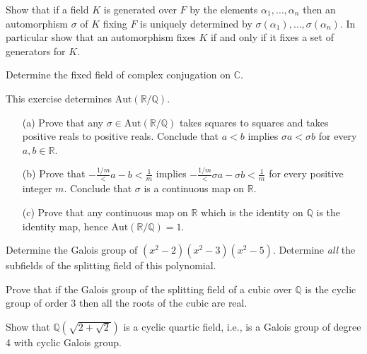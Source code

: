 \documentclass[12pt,letterpaper]{hmcpset}
\newcommand{\Rr}{\mathbb{R}}
\newcommand{\Qq}{\mathbb{Q}}
\newcommand{\Cc}{\mathbb{C}}
\newcommand{\Aut}[1]{\text{Aut} \left(#1\right) }
\begin{document}

\begin{problem}[14.1.1a]
  Show that if a field $K$ is generated over $F$ by the elements $\alpha_1, \dots , \alpha_n$ then an automorphism $\sigma$ of $K$ fixing $F$ is uniquely determined by $\sigma(\alpha_1), \dots, \sigma(\alpha_n)$. In particular show that an automorphism fixes $K$ if and only if it fixes a set of generators for $K$.
\end{problem}
\begin{solution}
\vfill
\end{solution}
\newpage

\begin{problem}[14.1.3]
  Determine the fixed field of complex conjugation on $\Cc$.
\end{problem}
\begin{solution}
\vfill
\end{solution}
\newpage

\begin{problem}[14.1.7]
  This exercise determines $\Aut{\Rr/\Qq}.$
  \begin{enumerate}
    \item [(a)] Prove that any $\sigma \in \Aut{\Rr/\Qq}$ takes squares to squares and takes positive reals to positive reals. Conclude that $a < b$ implies $\sigma a < \sigma b$ for every $a, b\in \Rr$.
    \item[(b)] Prove that $-\frac{1/m} < a - b < \frac{1}{m}$ implies $-\frac{1/m} < \sigma a - \sigma b < \frac{1}{m}$ for every positive integer $m$. Conclude that $\sigma $ is a continuous map on $\Rr.$
    \item[(c)] Prove that any continuous map on $\Rr$ which is the identity on $\Qq$ is the identity map, hence $\Aut{\Rr/\Qq} = 1$.
  \end{enumerate}
\end{problem}
\begin{solution}
\vfill
\end{solution}
\newpage

\begin{problem}[14.2.3]
  Determine the Galois group of $(x^2 - 2)(x^2 - 3)(x^2 - 5)$. Determine \emph{all} the subfields of the splitting field of this polynomial.
\end{problem}
\begin{solution}
\vfill
\end{solution}
\newpage

\begin{problem}[14.2.13]
  Prove that if the Galois group of the splitting field of a cubic over $\Qq$ is the cyclic group of order 3 then all the roots of the cubic are real.
\end{problem}
\begin{solution}
\vfill
\end{solution}
\newpage

\begin{problem}[14.2.14]
  Show that $\Qq(\sqrt{2+\sqrt{2}})$ is a cyclic quartic field, i.e., is a Galois group of degree 4 with cyclic Galois group.
\end{problem}
\begin{solution}
\vfill
\end{solution}
\end{document}
